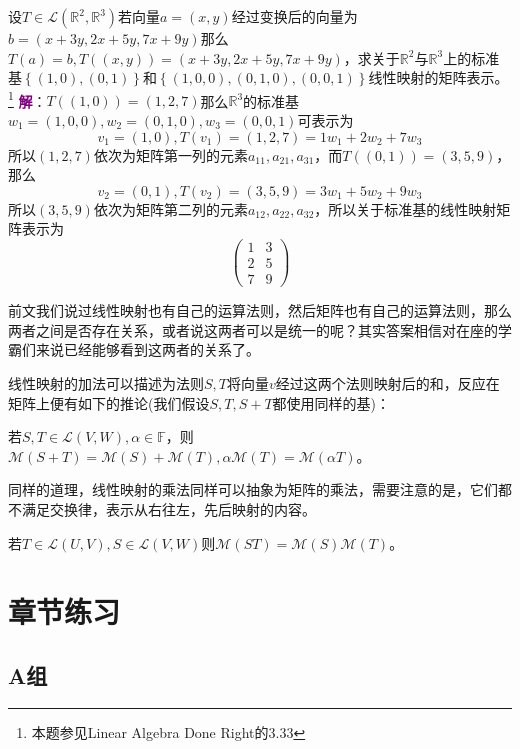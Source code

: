 \begin{example}
	设$T\in \mathcal{L}(\mathbb{R}^2,\mathbb{R}^3)$若向量$a=(x,y)$经过变换后的向量为$b=(x+3y,2x+5y,7x+9y)$那么$T(a)=b,T((x,y))=(x+3y,2x+5y,7x+9y)$，求关于$\mathbb{R}^2$与$\mathbb{R}^3$上的标准基$\left\{ (1,0),(0,1) \right\}$和$\left\{ (1,0,0),(0,1,0),(0,0,1) \right\}$线性映射的矩阵表示。\footnote{本题参见Linear Algebra Done Right的3.33}
	\tcblower
	\textcolor{purple}{\textbf{解}}：$T((1,0))=(1,2,7)$那么$\mathbb{R}^3$的标准基$w_1=(1,0,0),w_2=(0,1,0),w_3=(0,0,1)$可表示为$$v_1=(1,0),T(v_1)=(1,2,7)=1w_1+2w_2+7w_3$$所以$(1,2,7)$依次为矩阵第一列的元素$a_{11},a_{21},a_{31}$，而$T((0,1))=(3,5,9)$，那么$$v_2=(0,1),T(v_2)=(3,5,9)=3w_1+5w_2+9w_3$$所以$(3,5,9)$依次为矩阵第二列的元素$a_{12},a_{22},a_{32}$，所以关于标准基的线性映射矩阵表示为$$\begin{pmatrix}  
		1 & 3 \\  
		2 & 5 \\
		7 & 9 
	  \end{pmatrix} $$
\end{example}

前文我们说过线性映射也有自己的运算法则，然后矩阵也有自己的运算法则，那么两者之间是否存在关系，或者说这两者可以是统一的呢？其实答案相信对在座的学霸们来说已经能够看到这两者的关系了。

线性映射的加法可以描述为法则$S,T$将向量$v$经过这两个法则映射后的和，反应在矩阵上便有如下的推论(我们假设$S,T,S+T$都使用同样的基)：

\begin{corollary}
	若$S,T\in \mathcal{L}(V,W),\alpha\in\mathbb{F}$，则$\mathcal{M}(S+T)=\mathcal{M}(S)+\mathcal{M}(T),\alpha\mathcal{M}(T)=\mathcal{M}(\alpha T)$。
\end{corollary}

同样的道理，线性映射的乘法同样可以抽象为矩阵的乘法，需要注意的是，它们都不满足交换律，表示从右往左，先后映射的内容。

\begin{corollary}
	若$T\in \mathcal{L}(U,V),S\in \mathcal{L}(V,W)$则$\mathcal{M}(ST)=\mathcal{M}(S)\mathcal{M}(T)$。
\end{corollary}

\section{章节练习}

\subsection{A组}

